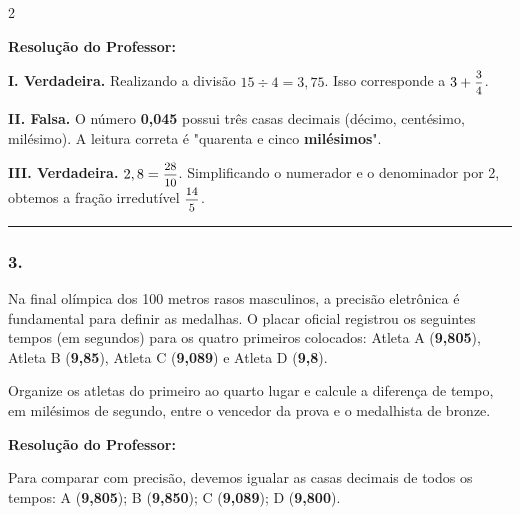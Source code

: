 \begin{multicols*}{2}
\ifgabarito
    \begin{tcolorbox}[colback=CorTitUm!5, colframe=CorTitUm, boxrule=1pt, arc=4pt, left=6pt, right=6pt, top=6pt, bottom=6pt]
    \small\textbf{\textcolor{CorTitUm}{Resolução do Professor:}}\par\vspace{0.1cm}
    \color{CinzaEscuro}
    \textbf{I. Verdadeira.} Realizando a divisão $15 \div 4 = 3,75$. Isso corresponde a $3 + \mfrac{3}{4}$.
    
    \textbf{II. Falsa.} O número \textbf{0,045} possui três casas decimais (décimo, centésimo, milésimo). A leitura correta é "quarenta e cinco \textbf{milésimos}".
    
    \textbf{III. Verdadeira.} $2,8 = \mfrac{28}{10}$. Simplificando o numerador e o denominador por 2, obtemos a fração irredutível $\mfrac{14}{5}$.
    \end{tcolorbox}
\fi

\par\vspace{\espacoQuestao}

\noindent\textcolor{CorLinha}{\rule{\linewidth}{0.5pt}} 
\par\vspace{\espacoPreQuestao}
\subsubsection*{3.} Na final olímpica dos 100 metros rasos masculinos, a precisão eletrônica é fundamental para definir as medalhas. O placar oficial registrou os seguintes tempos (em segundos) para os quatro primeiros colocados: Atleta A (\textbf{9,805}), Atleta B (\textbf{9,85}), Atleta C (\textbf{9,089}) e Atleta D (\textbf{9,8}).

Organize os atletas do primeiro ao quarto lugar e calcule a diferença de tempo, em milésimos de segundo, entre o vencedor da prova e o medalhista de bronze.

\ifgabarito
    \begin{tcolorbox}[colback=CorTitUm!5, colframe=CorTitUm, boxrule=1pt, arc=4pt, left=6pt, right=6pt, top=6pt, bottom=6pt]
    \small\textbf{\textcolor{CorTitUm}{Resolução do Professor:}}\par\vspace{0.1cm}
    \color{CinzaEscuro}
    Para comparar com precisão, devemos igualar as casas decimais de todos os tempos: A (\textbf{9,805}); B (\textbf{9,850}); C (\textbf{9,089}); D (\textbf{9,800}).
    

\end{tcolorbox}
\end{multicols*}
